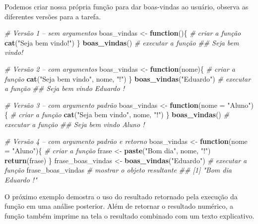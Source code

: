 \documentclass[
  11pt,
  a5paper,
  openany]{book}
\newenvironment{Shaded}{\begin{snugshade}}{\end{snugshade}}
\newcommand{\CommentTok}[1]{\textcolor[rgb]{0.56,0.35,0.01}{\textit{#1}}}
\newcommand{\ControlFlowTok}[1]{\textcolor[rgb]{0.13,0.29,0.53}{\textbf{#1}}}
\newcommand{\DataTypeTok}[1]{\textcolor[rgb]{0.13,0.29,0.53}{#1}}
\newcommand{\KeywordTok}[1]{\textcolor[rgb]{0.13,0.29,0.53}{\textbf{#1}}}
\newcommand{\NormalTok}[1]{#1}
\newcommand{\StringTok}[1]{\textcolor[rgb]{0.31,0.60,0.02}{#1}}
\begin{document}
Podemos criar nossa própria função para dar boas-vindas ao usuário, observa as diferentes versões para a tarefa.

\begin{Shaded}
\begin{Highlighting}[]
\CommentTok{# Versão 1 – sem argumentos}
\NormalTok{boas_vindas <-}\StringTok{ }\ControlFlowTok{function}\NormalTok{()\{ }\CommentTok{# criar a função}
  \KeywordTok{cat}\NormalTok{(}\StringTok{"Seja bem vindo!"}\NormalTok{)}
\NormalTok{\}}
\KeywordTok{boas_vindas}\NormalTok{() }\CommentTok{# executar a função}
\CommentTok{## Seja bem vindo!}

\CommentTok{# Versão 2 – com argumentos}
\NormalTok{boas_vindas <-}\StringTok{ }\ControlFlowTok{function}\NormalTok{(nome)\{ }\CommentTok{# criar a função}
  \KeywordTok{cat}\NormalTok{(}\StringTok{"Seja bem vindo"}\NormalTok{, nome, }\StringTok{"!"}\NormalTok{)}
\NormalTok{\}}
\KeywordTok{boas_vindas}\NormalTok{(}\StringTok{"Eduardo"}\NormalTok{) }\CommentTok{# executar a função}
\CommentTok{## Seja bem vindo Eduardo !}

\CommentTok{# Versão 3 – com argumento padrão}
\NormalTok{boas_vindas <-}\StringTok{ }\ControlFlowTok{function}\NormalTok{(}\DataTypeTok{nome =} \StringTok{"Aluno"}\NormalTok{)\{ }\CommentTok{# criar a função}
  \KeywordTok{cat}\NormalTok{(}\StringTok{"Seja bem vindo"}\NormalTok{, nome, }\StringTok{"!"}\NormalTok{)}
\NormalTok{\}}
\KeywordTok{boas_vindas}\NormalTok{() }\CommentTok{# executar a função}
\CommentTok{## Seja bem vindo Aluno !}

\CommentTok{# Versão 4 – com argumento padrão e retorno}
\NormalTok{boas_vindas <-}\StringTok{ }\ControlFlowTok{function}\NormalTok{(}\DataTypeTok{nome =} \StringTok{"Aluno"}\NormalTok{)\{ }\CommentTok{# criar a função}
\NormalTok{  frase <-}\StringTok{ }\KeywordTok{paste}\NormalTok{(}\StringTok{"Bom dia"}\NormalTok{, nome, }\StringTok{"!"}\NormalTok{)}
  \KeywordTok{return}\NormalTok{(frase)}
\NormalTok{\}}
\NormalTok{frase_boas_vindas <-}\StringTok{ }\KeywordTok{boas_vindas}\NormalTok{(}\StringTok{"Eduardo"}\NormalTok{) }\CommentTok{# executar a função}
\NormalTok{frase_boas_vindas }\CommentTok{# mostrar o objeto resultante}
\CommentTok{## [1] "Bom dia Eduardo !"}
\end{Highlighting}
\end{Shaded}

O próximo exemplo demostra o uso do resultado retornado pela execução da função em uma análise posterior. Além de retornar o resultado numérico, a função também imprime na tela o resultado combinado com um texto explicativo.
\end{document}
